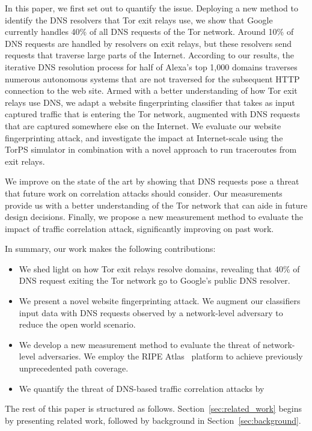 In this paper, we first set out to quantify the issue.  Deploying a new method
to identify the DNS resolvers that Tor exit relays use, we show that Google
currently handles 40\% of all DNS requests of the Tor network.  Around 10\% of
DNS requests are handled by resolvers on exit relays, but these resolvers send
requests that traverse large parts of the Internet.  According to our results,
the iterative DNS resolution process for half of Alexa's top 1,000 domains
traverses numerous autonomous systems that are not traversed for the subsequent
HTTP connection to the web site.  Armed with a better understanding of how Tor
exit relays use DNS, we adapt a website fingerprinting classifier that takes as
input captured traffic that is entering the Tor network, augmented with DNS
requests that are captured somewhere else on the Internet.  We evaluate our
website fingerprinting attack, and investigate the impact at Internet-scale
using the TorPS simulator in combination with a novel approach to run
traceroutes from exit relays.

We improve on the state of the art by showing that DNS requests pose a threat
that future work on correlation attacks should consider.  Our measurements
provide us with a better understanding of the Tor network that can aide in
future design decisions.  Finally, we propose a new measurement method to
evaluate the impact of traffic correlation attack, significantly improving on
past work.

In summary, our work makes the following contributions:
\begin{itemize}
	\item We shed light on how Tor exit relays resolve domains, revealing that
		40\% of DNS request exiting the Tor network go to Google's public DNS
		resolver.

	\item We present a novel website fingerprinting attack.  We augment our
		classifiers input data with DNS requests observed by a network-level
		adversary to reduce the open world scenario.

	\item We develop a new measurement method to evaluate the threat of
		network-level adversaries.  We employ the RIPE Atlas~\cite{atlas}
		platform to achieve previously unprecedented path coverage.

	\item We quantify the threat of DNS-based traffic correlation attacks by 
\end{itemize}

The rest of this paper is structured as follows.
Section~\ref{sec:related_work} begins by presenting related work, followed by
background in Section~\ref{sec:background}.
